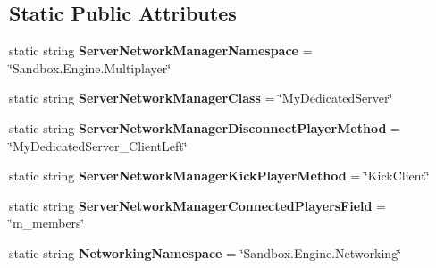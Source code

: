 \subsection*{Static Public Attributes}
\begin{DoxyCompactItemize}
\item 
\hypertarget{class_s_e_mod_a_p_i_internal_1_1_a_p_i_1_1_server_1_1_server_network_manager_a5283f231d4cdc126d10b20dfc06d301f}{}static string {\bfseries Server\+Network\+Manager\+Namespace} = \char`\"{}Sandbox.\+Engine.\+Multiplayer\char`\"{}\label{class_s_e_mod_a_p_i_internal_1_1_a_p_i_1_1_server_1_1_server_network_manager_a5283f231d4cdc126d10b20dfc06d301f}

\item 
\hypertarget{class_s_e_mod_a_p_i_internal_1_1_a_p_i_1_1_server_1_1_server_network_manager_a8b029a40a89134085dacb6a03f328a96}{}static string {\bfseries Server\+Network\+Manager\+Class} = \char`\"{}My\+Dedicated\+Server\char`\"{}\label{class_s_e_mod_a_p_i_internal_1_1_a_p_i_1_1_server_1_1_server_network_manager_a8b029a40a89134085dacb6a03f328a96}

\item 
\hypertarget{class_s_e_mod_a_p_i_internal_1_1_a_p_i_1_1_server_1_1_server_network_manager_a5d458b814ff666300b7e38d9f6e4ea19}{}static string {\bfseries Server\+Network\+Manager\+Disconnect\+Player\+Method} = \char`\"{}My\+Dedicated\+Server\+\_\+\+Client\+Left\char`\"{}\label{class_s_e_mod_a_p_i_internal_1_1_a_p_i_1_1_server_1_1_server_network_manager_a5d458b814ff666300b7e38d9f6e4ea19}

\item 
\hypertarget{class_s_e_mod_a_p_i_internal_1_1_a_p_i_1_1_server_1_1_server_network_manager_aa2067e718bab36c0745a8ed5defba36f}{}static string {\bfseries Server\+Network\+Manager\+Kick\+Player\+Method} = \char`\"{}Kick\+Client\char`\"{}\label{class_s_e_mod_a_p_i_internal_1_1_a_p_i_1_1_server_1_1_server_network_manager_aa2067e718bab36c0745a8ed5defba36f}

\item 
\hypertarget{class_s_e_mod_a_p_i_internal_1_1_a_p_i_1_1_server_1_1_server_network_manager_aa7d5b77741e2a35b49374b15be190851}{}static string {\bfseries Server\+Network\+Manager\+Connected\+Players\+Field} = \char`\"{}m\+\_\+members\char`\"{}\label{class_s_e_mod_a_p_i_internal_1_1_a_p_i_1_1_server_1_1_server_network_manager_aa7d5b77741e2a35b49374b15be190851}

\item 
\hypertarget{class_s_e_mod_a_p_i_internal_1_1_a_p_i_1_1_server_1_1_server_network_manager_ac2526399a2efb5f384898da32b2524cb}{}static string {\bfseries Networking\+Namespace} = \char`\"{}Sandbox.\+Engine.\+Networking\char`\"{}\label{class_s_e_mod_a_p_i_internal_1_1_a_p_i_1_1_server_1_1_server_network_manager_ac2526399a2efb5f384898da32b2524cb}


\end{DoxyCompactItemize}
